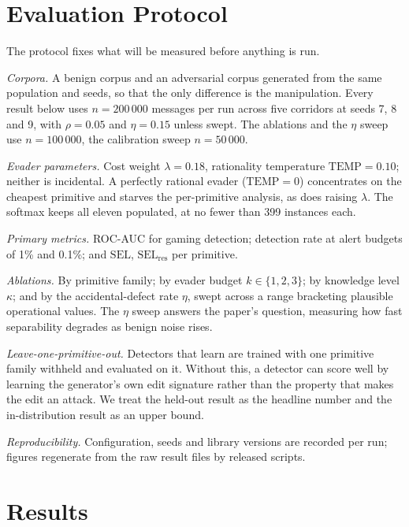 \documentclass[conference]{IEEEtran}
\begin{document}
\section{Evaluation Protocol}
\label{sec:proto}

The protocol fixes what will be measured before anything is run.

\emph{Corpora.} A benign corpus and an adversarial corpus generated from the
same population and seeds, so that the only difference is the manipulation.
Every result below uses $n=200\,000$ messages per run across five corridors
at seeds 7, 8 and 9, with $\rho=0.05$ and $\eta=0.15$ unless swept. The
ablations and the $\eta$ sweep use $n=100\,000$, the calibration sweep
$n=50\,000$.

\emph{Evader parameters.} Cost weight $\lambda=0.18$, rationality
temperature $\mathrm{TEMP}=0.10$; neither is incidental. A perfectly
rational evader ($\mathrm{TEMP}=0$) concentrates on the cheapest primitive
and starves the per-primitive analysis, as does raising $\lambda$. The
softmax keeps all eleven populated, at no fewer than 399 instances each.

\emph{Primary metrics.} ROC-AUC for gaming detection; detection rate at
alert budgets of 1\% and 0.1\%; and $\mathrm{SEL}$, $\mathrm{SEL_{res}}$ per
primitive.

\emph{Ablations.} By primitive family; by evader budget $k \in \{1,2,3\}$;
by knowledge level $\kappa$; and by the accidental-defect rate $\eta$, swept
across a range bracketing plausible operational values. The $\eta$ sweep
answers the paper's question, measuring how fast separability degrades as
benign noise rises.

\emph{Leave-one-primitive-out.} Detectors that learn are trained with one
primitive family withheld and evaluated on it. Without this, a detector can
score well by learning the generator's own edit signature rather than the
property that makes the edit an attack. We treat the held-out result as the
headline number and the in-distribution result as an upper bound.

\emph{Reproducibility.} Configuration, seeds and library versions are
recorded per run; figures regenerate from the raw result files by released
scripts.

\section{Results}
\label{sec:results}
\end{document}
